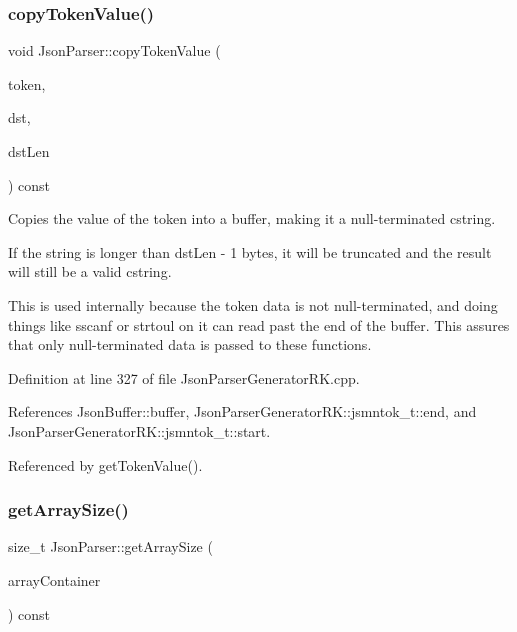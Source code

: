 \mbox{\label{class_json_parser_ab7f8a2873dd3a2935cf0a22133a5378f}} 
\subsubsection{\texorpdfstring{copy\+Token\+Value()}{copyTokenValue()}}
{\footnotesize\ttfamily void Json\+Parser\+::copy\+Token\+Value (\begin{DoxyParamCaption}\item[{const \hyperlink{struct_json_parser_generator_r_k_1_1jsmntok__t}{Json\+Parser\+Generator\+R\+K\+::jsmntok\+\_\+t} $\ast$}]{token,  }\item[{char $\ast$}]{dst,  }\item[{size\+\_\+t}]{dst\+Len }\end{DoxyParamCaption}) const}



Copies the value of the token into a buffer, making it a null-\/terminated cstring. 

If the string is longer than dst\+Len -\/ 1 bytes, it will be truncated and the result will still be a valid cstring.

This is used internally because the token data is not null-\/terminated, and doing things like sscanf or strtoul on it can read past the end of the buffer. This assures that only null-\/terminated data is passed to these functions. 

Definition at line 327 of file Json\+Parser\+Generator\+R\+K.\+cpp.



References Json\+Buffer\+::buffer, Json\+Parser\+Generator\+R\+K\+::jsmntok\+\_\+t\+::end, and Json\+Parser\+Generator\+R\+K\+::jsmntok\+\_\+t\+::start.



Referenced by get\+Token\+Value().

\mbox{\label{class_json_parser_aeb46af21c13fa2396e065543bd8db265}} 
\subsubsection{\texorpdfstring{get\+Array\+Size()}{getArraySize()}}
{\footnotesize\ttfamily size\+\_\+t Json\+Parser\+::get\+Array\+Size (\begin{DoxyParamCaption}\item[{const \hyperlink{struct_json_parser_generator_r_k_1_1jsmntok__t}{Json\+Parser\+Generator\+R\+K\+::jsmntok\+\_\+t} $\ast$}]{array\+Container }\end{DoxyParamCaption}) const}



